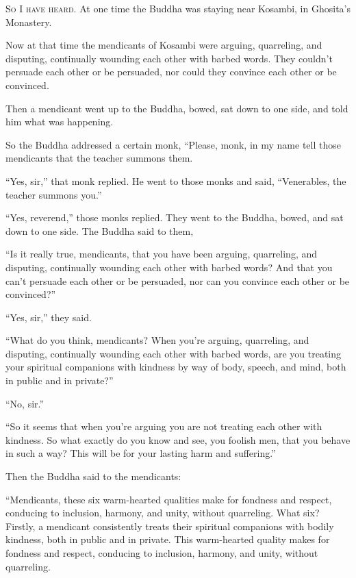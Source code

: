 \documentclass[12pt,openany]{book}%
\newcommand*{\scevam}[1]{\textsc{#1}}
\begin{document}
\scevam{So I have heard. }At one time the Buddha was staying near Kosambi, in Ghosita’s Monastery. 

Now at that time the mendicants of Kosambi were arguing, quarreling, and disputing, continually wounding each other with barbed words. They couldn’t persuade each other or be persuaded, nor could they convince each other or be convinced. 

Then a mendicant went up to the Buddha, bowed, sat down to one side, and told him what was happening. 

So the Buddha addressed a certain monk, “Please, monk, in my name tell those mendicants that the teacher summons them. 

“Yes, sir,” that monk replied. He went to those monks and said, “Venerables, the teacher summons you.” 

“Yes, reverend,” those monks replied. They went to the Buddha, bowed, and sat down to one side. The Buddha said to them, 

“Is it really true, mendicants, that you have been arguing, quarreling, and disputing, continually wounding each other with barbed words? And that you can’t persuade each other or be persuaded, nor can you convince each other or be convinced?” 

“Yes, sir,” they said. 

“What do you think, mendicants? When you’re arguing, quarreling, and disputing, continually wounding each other with barbed words, are you treating your spiritual companions with kindness by way of body, speech, and mind, both in public and in private?” 

“No, sir.” 

“So it seems that when you’re arguing you are not treating each other with kindness. So what exactly do you know and see, you foolish men, that you behave in such a way? This will be for your lasting harm and suffering.” 

Then the Buddha said to the mendicants: 

“Mendicants, these six warm-hearted qualities make for fondness and respect, conducing to inclusion, harmony, and unity, without quarreling. What six? Firstly, a mendicant consistently treats their spiritual companions with bodily kindness, both in public and in private. This warm-hearted quality makes for fondness and respect, conducing to inclusion, harmony, and unity, without quarreling. 
\end{document}
